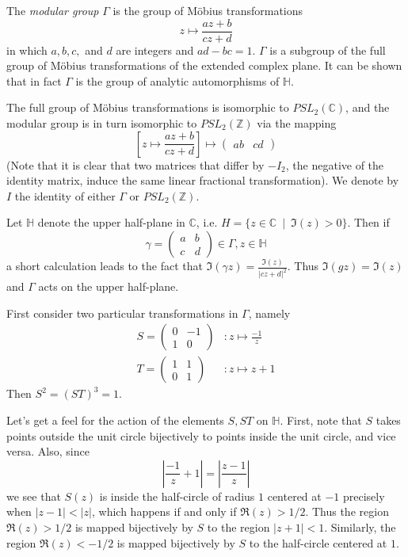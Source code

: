 \documentclass[12pt]{article}
\newcommand{\Complex}{\mathbb{C}}
\newcommand{\Half}{\mathbb{H}}
\newcommand{\Ints}{\mathbb{Z}}
\begin{document}
The \emph{modular group} $\Gamma$ is the group of M\"obius transformations
\[z\mapsto \frac{az+b}{cz+d}\]
in which $a,b,c,$ and $d$ are integers and $ad-bc=1$. $\Gamma$ is a subgroup of the full group of M\"obius transformations of the extended complex plane. It can be shown that in fact $\Gamma$ is the group of analytic automorphisms of $\Half$.

The full group of M\"obius transformations is isomorphic to $PSL_2(\Complex)$, and the modular group is in turn isomorphic to $PSL_2(\Ints)$ via the mapping
\[\left[z\mapsto \frac{az+b}{cz+d}\right]\mapsto \begin{pmatrix} a b & c d\end{pmatrix}\]
(Note that it is clear that two matrices that differ by $-I_2$, the negative of the identity matrix, induce the same linear fractional transformation). We denote by $I$ the identity of either $\Gamma$ or $PSL_2(\Ints)$.

Let $\Half$ denote the upper half-plane in $\Complex$, i.e. $H=\{z\in\Complex\ \mid\ \Im(z)>0\}$. Then if \[\gamma=\begin{pmatrix}a&b\\c&d\end{pmatrix}\in\Gamma, z\in\Half\]
a short calculation leads to the fact that $\displaystyle\Im(\gamma z)=\frac{\Im(z)}{\lvert cz+d\rvert^2}$. Thus $\Im(gz)=\Im(z)$ and $\Gamma$ acts on the upper half-plane.

First consider two particular transformations in $\Gamma$, namely
\begin{align*}
S=\begin{pmatrix}0 &-1\\ 1 &0\end{pmatrix} &:z\mapsto \frac{-1}{z}\\
T=\begin{pmatrix}1 &1 \\ 0& 1\end{pmatrix} &:z\mapsto z+1
\end{align*}
Then $S^2=(ST)^3=1$.

Let's get a feel for the action of the elements $S,ST$ on $\Half$. First, note that $S$ takes points outside the unit circle bijectively to points inside the unit circle, and vice versa. Also, since
\[\left\lvert\frac{-1}{z}+1\right\rvert=\left\lvert\frac{z-1}{z}\right\rvert\]
we see that $S(z)$ is inside the half-circle of radius $1$ centered at $-1$ precisely when $\lvert z-1\rvert < \lvert z\rvert$, which happens if and only if $\Re (z)>1/2$. Thus the region $\Re(z)>1/2$ is mapped bijectively by $S$ to the region $\lvert z+1\rvert<1$. Similarly, the region $\Re(z)<-1/2$ is mapped bijectively by $S$ to the half-circle centered at $1$.
\end{document}
